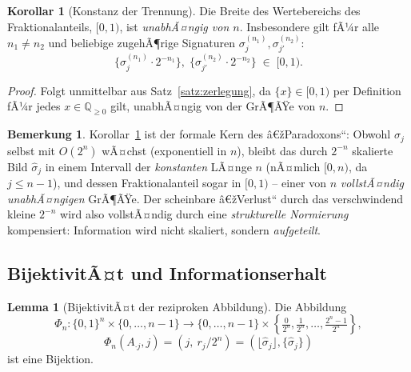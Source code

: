 ﻿\documentclass[a4paper,12pt]{article}
\theoremstyle{definition}
\newtheorem{lemma}{Lemma}
\newtheorem{bemerkung}{Bemerkung}
\newtheorem{korollar}{Korollar}
\begin{document}
\begin{korollar}[Konstanz der Trennung]
\label{kor:konstanz}
	Die Breite des Wertebereichs des Fraktionalanteils, $[0,1)$, ist
	\emph{unabhÃ¤ngig von $n$}. Insbesondere gilt fÃ¼r alle $n_1 \neq n_2$ und
	beliebige zugehÃ¶rige Signaturen $\sigma^{(n_1)}_j, \sigma^{(n_2)}_{j'}$:
	\[
		\{\sigma^{(n_1)}_j \cdot 2^{-n_1}\},\;
		\{\sigma^{(n_2)}_{j'} \cdot 2^{-n_2}\} \;\in\; [0,1).
	\]
\end{korollar}

\begin{proof}
	Folgt unmittelbar aus Satz~\ref{satz:zerlegung}, da $\{x\}\in[0,1)$ per
	Definition fÃ¼r jedes $x\in\mathbb{Q}_{\geq0}$ gilt, unabhÃ¤ngig von der
	GrÃ¶ÃŸe von $n$.
\end{proof}

\begin{bemerkung}
	Korollar~\ref{kor:konstanz} ist der formale Kern des â€žParadoxons``: Obwohl
	$\sigma_j$ selbst mit $O(2^n)$ wÃ¤chst (exponentiell in $n$), bleibt das
	durch $2^{-n}$ skalierte Bild $\hat\sigma_j$ in einem Intervall der
	\emph{konstanten} LÃ¤nge $n$ (nÃ¤mlich $[0,n)$, da $j \leq n-1$), und
	dessen Fraktionalanteil sogar in $[0,1)$ -- einer von $n$
	\emph{vollstÃ¤ndig unabhÃ¤ngigen} GrÃ¶ÃŸe. Der scheinbare â€žVerlust`` durch
	das verschwindend kleine $2^{-n}$ wird also vollstÃ¤ndig durch eine
	\emph{strukturelle Normierung} kompensiert: Information wird nicht
	skaliert, sondern \emph{aufgeteilt}.
\end{bemerkung}

\subsection{BijektivitÃ¤t und Informationserhalt}

\begin{lemma}[BijektivitÃ¤t der reziproken Abbildung]
\label{lem:bijektiv}
	Die Abbildung
	\[
		\Phi_n : \{0,1\}^n \times \{0,\ldots,n-1\} \longrightarrow
		\{0,\ldots,n-1\} \times \left\{\tfrac{0}{2^n},\tfrac{1}{2^n},\ldots,\tfrac{2^n-1}{2^n}\right\},
	\]
	\[
		\Phi_n(A_{\cdot j}, j) = (j,\ r_j/2^n) = (\lfloor\hat\sigma_j\rfloor, \{\hat\sigma_j\})
	\]
	ist eine Bijektion.
\end{lemma}
\end{document}
